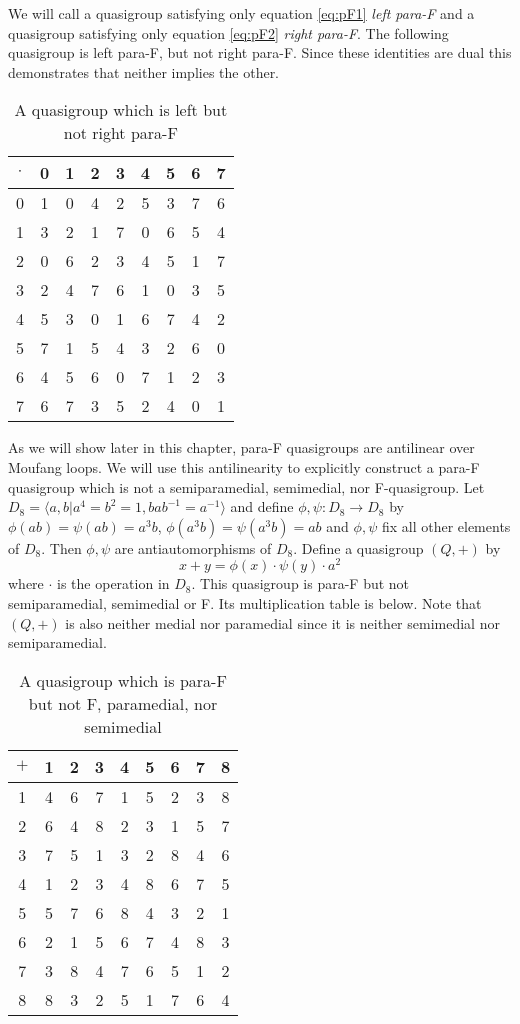 \documentclass[12pt]{report}
\theoremstyle{definition}
\begin{document}
We will call a quasigroup satisfying only equation \ref{eq:pF1} \emph{left para-F} and a quasigroup
  satisfying only equation \ref{eq:pF2} \emph{right para-F}. The following quasigroup is left para-F,
  but not right para-F. Since these identities are dual this demonstrates that neither implies the other.

\begin{table}[H]
  \centering
  \begin{tabular}{c | c c c c c c c c}
    $\cdot$ & 0 & 1 & 2 & 3 & 4 & 5 & 6 & 7 \\
    \hline \hline
    0 & 1& 0& 4& 2& 5& 3& 7& 6\\
	  1 & 3& 2& 1& 7& 0& 6& 5& 4\\
	  2 & 0& 6& 2& 3& 4& 5& 1& 7\\
	  3 & 2& 4& 7& 6& 1& 0& 3& 5\\
	  4 & 5& 3& 0& 1& 6& 7& 4& 2\\
	  5 & 7& 1& 5& 4& 3& 2& 6& 0\\
	  6 & 4& 5& 6& 0& 7& 1& 2& 3\\
	  7 & 6& 7& 3& 5& 2& 4& 0& 1
  \end{tabular}
  \caption{A quasigroup which is left but not right para-F}
\end{table}

As we will show later in this chapter, para-F quasigroups are antilinear over Moufang loops. We will
  use this antilinearity to explicitly construct a para-F quasigroup which is not a semiparamedial,
  semimedial, nor F-quasigroup. Let $D_8 = \langle a, b | a^4 = b^2 = 1, bab^{-1} = a^{-1}\rangle$
  and define $\phi, \psi : D_8\to D_8$ by 
  $\phi(ab) = \psi(ab) = a^3 b$, $\phi(a^3 b) = \psi(a^3 b) = ab$ and $\phi, \psi$ fix all other
  elements of $D_8$. Then $\phi, \psi$ are antiautomorphisms of $D_8$. Define a quasigroup $(Q, +)$ by
\[x + y = \phi(x) \cdot \psi(y) \cdot a^2\]
where $\cdot$ is the operation in $D_8$. This quasigroup is para-F but not semiparamedial, semimedial or F.
  Its multiplication table is below. Note that $(Q, +)$ is also neither medial nor paramedial since it is
  neither semimedial nor semiparamedial.

\begin{table}[H]
  \centering
  \begin{tabular}{c | c c c c c c c c}
    $+$ & 1 & 2 & 3 & 4 & 5 & 6 & 7 & 8\\
    \hline \hline
    1& 4& 6& 7& 1& 5& 2& 3& 8\\
    2& 6& 4& 8& 2& 3& 1& 5& 7\\
    3& 7& 5& 1& 3& 2& 8& 4& 6\\
    4& 1& 2& 3& 4& 8& 6& 7& 5\\
    5& 5& 7& 6& 8& 4& 3& 2& 1\\
    6& 2& 1& 5& 6& 7& 4& 8& 3\\
    7& 3& 8& 4& 7& 6& 5& 1& 2\\
    8& 8& 3& 2& 5& 1& 7& 6& 4 
  \end{tabular}
  \caption{A quasigroup which is para-F but not F, paramedial, nor semimedial}
\end{table}
\end{document}

